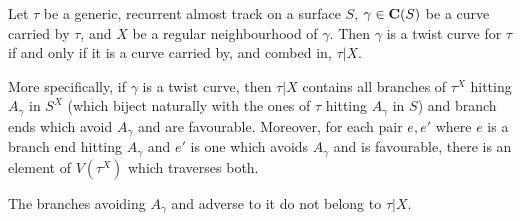 \begin{lemma}\label{lem:twistininduced}
Let $\tau$ be a generic, recurrent almost track on a surface $S$, $\gamma\in \mathbf C(S)$ be a curve carried by $\tau$, and $X$ be a regular neighbourhood of $\gamma$. Then $\gamma$ is a twist curve for $\tau$ if and only if it is a curve carried by, and combed in, $\tau|X$.

More specifically, if $\gamma$ is a twist curve, then $\tau|X$ contains all branches of $\tau^X$ hitting $A_\gamma$ in $S^X$ (which biject naturally with the ones of $\tau$ hitting $A_\gamma$ in $S$) and branch ends which avoid $A_\gamma$ and are favourable. Moreover, for each pair $e,e'$ where $e$ is a branch end hitting $A_\gamma$ and $e'$ is one which avoids $A_\gamma$ and is favourable, there is an element of $V(\tau^X)$ which traverses both.

The branches avoiding $A_\gamma$ and adverse to it do not belong to $\tau|X$.
\end{lemma}
